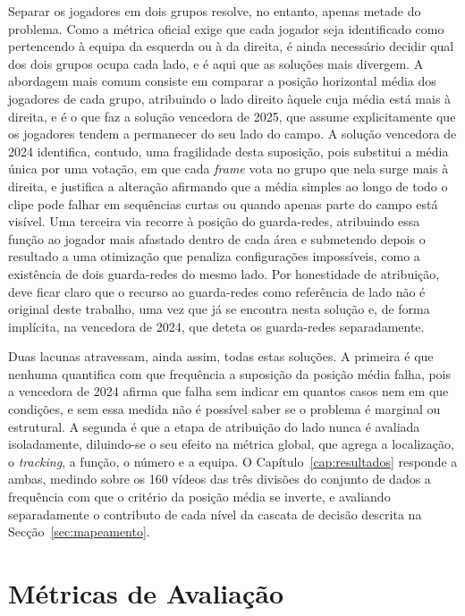 Separar os jogadores em dois grupos resolve, no entanto, apenas metade do problema. Como a métrica oficial exige que cada jogador seja identificado como pertencendo à equipa da esquerda ou à da direita, é ainda necessário decidir qual dos dois grupos ocupa cada lado, e é aqui que as soluções mais divergem. A abordagem mais comum consiste em comparar a posição horizontal média dos jogadores de cada grupo, atribuindo o lado direito àquele cuja média está mais à direita, e é o que faz a solução vencedora de 2025, que assume explicitamente que os jogadores tendem a permanecer do seu lado do campo. A solução vencedora de 2024 identifica, contudo, uma fragilidade desta suposição, pois substitui a média única por uma votação, em que cada \emph{frame} vota no grupo que nela surge mais à direita, e justifica a alteração afirmando que a média simples ao longo de todo o clipe pode falhar em sequências curtas ou quando apenas parte do campo está visível. Uma terceira via recorre à posição do guarda-redes, atribuindo essa função ao jogador mais afastado dentro de cada área e submetendo depois o resultado a uma otimização que penaliza configurações impossíveis, como a existência de dois guarda-redes do mesmo lado. Por honestidade de atribuição, deve ficar claro que o recurso ao guarda-redes como referência de lado não é original deste trabalho, uma vez que já se encontra nesta solução e, de forma implícita, na vencedora de 2024, que deteta os guarda-redes separadamente.

Duas lacunas atravessam, ainda assim, todas estas soluções. A primeira é que nenhuma quantifica com que frequência a suposição da posição média falha, pois a vencedora de 2024 afirma que falha sem indicar em quantos casos nem em que condições, e sem essa medida não é possível saber se o problema é marginal ou estrutural. A segunda é que a etapa de atribuição do lado nunca é avaliada isoladamente, diluindo-se o seu efeito na métrica global, que agrega a localização, o \emph{tracking}, a função, o número e a equipa. O Capítulo~\ref{cap:resultados} responde a ambas, medindo sobre os 160 vídeos das três divisões do conjunto de dados a frequência com que o critério da posição média se inverte, e avaliando separadamente o contributo de cada nível da cascata de decisão descrita na Secção~\ref{sec:mapeamento}.

\section{Métricas de Avaliação}\label{sec:metricas}

